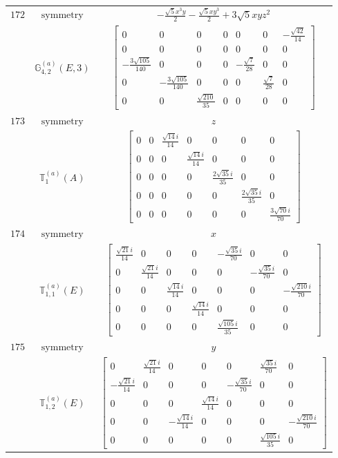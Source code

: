 \documentclass[fleqn,8pt,landscape]{jsarticle}
\begin{document}
\begin{longtable}{ccc}
$ 172 $ & $ \text{symmetry} $ & $ - \frac{\sqrt{5} x^{3} y}{2} - \frac{\sqrt{5} x y^{3}}{2} + 3 \sqrt{5} x y z^{2} $ \\
$  $ & $ \mathbb{G}_{4,2}^{(a)}(E,3) $ & $ \begin{bmatrix} 0 & 0 & 0 & 0 & 0 & 0 & - \frac{\sqrt{42}}{14} \\ 0 & 0 & 0 & 0 & 0 & 0 & 0 \\ - \frac{3 \sqrt{105}}{140} & 0 & 0 & 0 & - \frac{\sqrt{7}}{28} & 0 & 0 \\ 0 & - \frac{3 \sqrt{105}}{140} & 0 & 0 & 0 & \frac{\sqrt{7}}{28} & 0 \\ 0 & 0 & \frac{\sqrt{210}}{35} & 0 & 0 & 0 & 0 \end{bmatrix} $ \\ \hline
$ 173 $ & $ \text{symmetry} $ & $ z $ \\
$  $ & $ \mathbb{T}_{1}^{(a)}(A) $ & $ \begin{bmatrix} 0 & 0 & \frac{\sqrt{14} i}{14} & 0 & 0 & 0 & 0 \\ 0 & 0 & 0 & \frac{\sqrt{14} i}{14} & 0 & 0 & 0 \\ 0 & 0 & 0 & 0 & \frac{2 \sqrt{35} i}{35} & 0 & 0 \\ 0 & 0 & 0 & 0 & 0 & \frac{2 \sqrt{35} i}{35} & 0 \\ 0 & 0 & 0 & 0 & 0 & 0 & \frac{3 \sqrt{70} i}{70} \end{bmatrix} $ \\ \hline
$ 174 $ & $ \text{symmetry} $ & $ x $ \\
$  $ & $ \mathbb{T}_{1,1}^{(a)}(E) $ & $ \begin{bmatrix} \frac{\sqrt{21} i}{14} & 0 & 0 & 0 & - \frac{\sqrt{35} i}{70} & 0 & 0 \\ 0 & \frac{\sqrt{21} i}{14} & 0 & 0 & 0 & - \frac{\sqrt{35} i}{70} & 0 \\ 0 & 0 & \frac{\sqrt{14} i}{14} & 0 & 0 & 0 & - \frac{\sqrt{210} i}{70} \\ 0 & 0 & 0 & \frac{\sqrt{14} i}{14} & 0 & 0 & 0 \\ 0 & 0 & 0 & 0 & \frac{\sqrt{105} i}{35} & 0 & 0 \end{bmatrix} $ \\ \hline
$ 175 $ & $ \text{symmetry} $ & $ y $ \\
$  $ & $ \mathbb{T}_{1,2}^{(a)}(E) $ & $ \begin{bmatrix} 0 & \frac{\sqrt{21} i}{14} & 0 & 0 & 0 & \frac{\sqrt{35} i}{70} & 0 \\ - \frac{\sqrt{21} i}{14} & 0 & 0 & 0 & - \frac{\sqrt{35} i}{70} & 0 & 0 \\ 0 & 0 & 0 & \frac{\sqrt{14} i}{14} & 0 & 0 & 0 \\ 0 & 0 & - \frac{\sqrt{14} i}{14} & 0 & 0 & 0 & - \frac{\sqrt{210} i}{70} \\ 0 & 0 & 0 & 0 & 0 & \frac{\sqrt{105} i}{35} & 0 \end{bmatrix} $ \\ \hline

\end{longtable}
\end{document}
